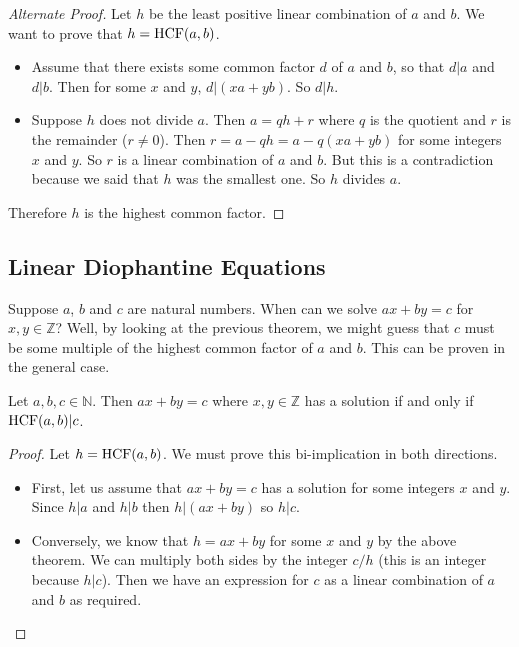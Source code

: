\documentclass{article}
\begin{document}
	\begin{proof}[Alternate Proof]
		Let $h$ be the least positive linear combination of $a$ and $b$. We want to prove that $h = \operatorname{HCF} (a, b)$.
		\begin{itemize}
			\item Assume that there exists some common factor $d$ of $a$ and $b$, so that $d|a$ and $d|b$. Then for some $x$ and $y$, $d | (xa + yb)$. So $d | h$.
			\item Suppose $h$ does not divide $a$. Then $a = qh + r$ where $q$ is the quotient and $r$ is the remainder ($r \neq 0$). Then $r = a - qh = a - q(xa + yb)$ for some integers $x$ and $y$. So $r$ is a linear combination of $a$ and $b$. But this is a contradiction because we said that $h$ was the smallest one. So $h$ divides $a$.
		\end{itemize}
		Therefore $h$ is the highest common factor.
	\end{proof}

	\subsection{Linear Diophantine Equations}
	Suppose $a$, $b$ and $c$ are natural numbers. When can we solve $ax + by = c$ for $x, y \in \mathbb Z$? Well, by looking at the previous theorem, we might guess that $c$ must be some multiple of the highest common factor of $a$ and $b$. This can be proven in the general case.
	\begin{corollary}
		Let $a, b, c \in \mathbb N$. Then $ax + by = c$ where $x, y \in \mathbb Z$ has a solution if and only if $\operatorname{HCF}(a, b) | c$.
	\end{corollary}
	\begin{proof}
		Let $h = \operatorname{HCF}(a, b)$. We must prove this bi-implication in both directions.
		\begin{itemize}
			\item First, let us assume that $ax+by=c$ has a solution for some integers $x$ and $y$. Since $h | a$ and $h | b$ then $h | (ax+by)$ so $h | c$.
			\item Conversely, we know that $h = ax + by$ for some $x$ and $y$ by the above theorem. We can multiply both sides by the integer $c/h$ (this is an integer because $h | c$). Then we have an expression for $c$ as a linear combination of $a$ and $b$ as required.
		\end{itemize}
	\end{proof}
\end{document}
